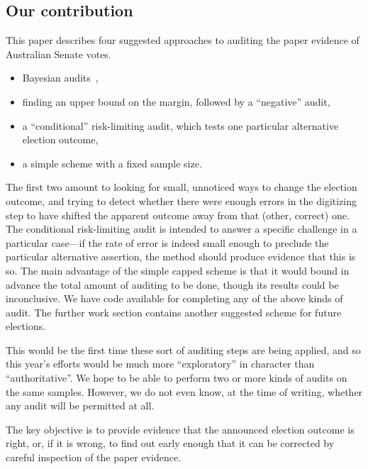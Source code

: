\documentclass[10pt,a4paper]{article}
\begin{document}
\subsection{Our contribution}
This paper describes four suggested approaches to auditing the paper evidence of Australian Senate votes.  
\begin{itemize}
	\item Bayesian audits~\cite{rivest2012bayesian},
	\item finding an upper bound on the margin, followed by a ``negative'' audit,
	\item a ``conditional'' risk-limiting audit, which tests one particular alternative election outcome,
	\item a simple scheme with a fixed sample size. 
\end{itemize}


The first two amount to looking for small, unnoticed ways to change the election outcome, and trying to detect whether there were enough errors in the digitizing step to have shifted the apparent outcome away from that (other, correct) one. The conditional risk-limiting audit is intended to answer a specific challenge in a particular case---if the rate of error is indeed small enough to preclude the particular alternative assertion, the method should produce evidence that this is so.  The main advantage of the simple capped scheme is that it would bound in advance the total amount of auditing to be done, though its results could be inconclusive.  We have code available for completing any of the above kinds of audit.  The further work section contains another suggested scheme for future elections.

This would be the first time these sort of auditing steps are being applied, and so this year's efforts would be much more ``exploratory'' in character than ``authoritative''.  We hope to be able to perform two or more kinds of audits on the same samples.  However, we do not even know, at the time of writing, whether any audit will be permitted at all.  

The key objective is to provide evidence that the announced election outcome is right, or, if it is wrong, to find out early enough that it can be corrected by careful inspection of the paper evidence.
\end{document}
